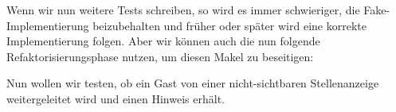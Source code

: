 Wenn wir nun weitere Tests schreiben, so wird es immer schwieriger, die Fake-Implementierung beizubehalten und früher oder später wird eine korrekte Implementierung folgen. 
Aber wir können auch die nun folgende Refaktorisierungsphase nutzen, um diesen Makel zu beseitigen:
\tddrefactor
%                                                                                                                                                                    
\begin{ruby}[label=app/controllers/jobs\_controller.rb]
 
    \PY{o}{[}\PY{o}{]}
\end{ruby}


Nun wollen wir testen, ob ein Gast von einer nicht-sichtbaren Stellenanzeige weitergeleitet wird und einen Hinweis erhält.

